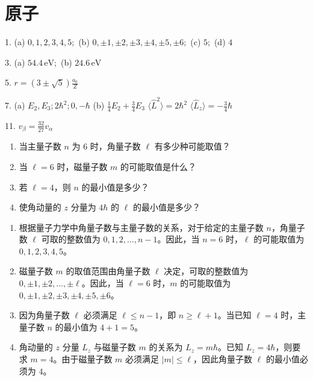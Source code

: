 \chapter{原子}

\begin{oddanswers}
1. (a) $0, 1, 2, 3, 4, 5;$
(b) $0, \pm 1, \pm 2, \pm 3, \pm 4, \pm 5, \pm 6;$
(c) $5;$ (d) $4$

3. (a) $54.4\,\mathrm{eV};$ (b) $24.6\,\mathrm{eV}$

5. $r = (3 \pm \sqrt{5}) \frac{a_0}{Z}$

7. (a) $E_2, E_3; 2\hbar^2; 0, -\hbar$
(b) $\frac{1}{4} E_2 + \frac{3}{4} E_3$
$\langle \hat{L}^2 \rangle = 2\hbar^2$
$\langle \hat{L}_z \rangle = -\frac{3}{4}\hbar$

11. $v_{\beta} = \frac{32}{27} v_{\alpha}$
\end{oddanswers}

\begin{exercise}\label{ex:25.1}
\begin{enumerate}
  \item[(a)] 当主量子数 $n$ 为 $6$ 时，角量子数 $\ell$ 有多少种可能取值？
  \item[(b)] 当 $\ell=6$ 时，磁量子数 $m$ 的可能取值是什么？
  \item[(c)] 若 $\ell=4$，则 $n$ 的最小值是多少？
  \item[(d)] 使角动量的 $z$ 分量为 $4\hbar$ 的 $\ell$ 的最小值是多少？
\end{enumerate}
\end{exercise}
\begin{solution}
\begin{enumerate}
    \item[(a)] 根据量子力学中角量子数与主量子数的关系，对于给定的主量子数 $n$，角量子数 $\ell$ 可取的整数值为 $0, 1, 2, \dots, n-1$。因此，当 $n=6$ 时，$\ell$ 的可能取值为 $0, 1, 2, 3, 4, 5$。
    
    \item[(b)] 磁量子数 $m$ 的取值范围由角量子数 $\ell$ 决定，可取的整数值为 $0, \pm 1, \pm 2, \dots, \pm \ell$。因此，当 $\ell=6$ 时，$m$ 的可能取值为 $0, \pm 1, \pm 2, \pm 3, \pm 4, \pm 5, \pm 6$。
    
    \item[(c)] 因为角量子数 $\ell$ 必须满足 $\ell \le n-1$，即 $n \ge \ell + 1$。当已知 $\ell=4$ 时，主量子数 $n$ 的最小值为 $4 + 1 = 5$。
    
    \item[(d)] 角动量的 $z$ 分量 $L_z$ 与磁量子数 $m$ 的关系为 $L_z = m\hbar$。已知 $L_z = 4\hbar$，则要求 $m = 4$。由于磁量子数 $m$ 必须满足 $|m| \le \ell$，因此角量子数 $\ell$ 的最小值必须为 $4$。
\end{enumerate}
\end{solution}


